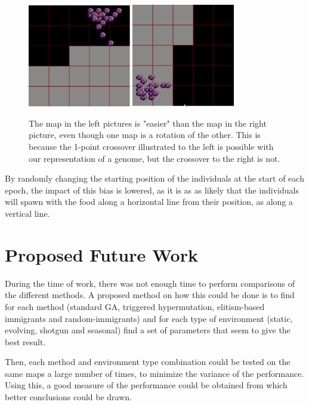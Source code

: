 \documentclass[a4paper,12pt]{article}
\begin{document}
\begin{figure}[h!]
\includegraphics[width=0.4\textwidth]{TopRight.png}
\includegraphics[width=0.4\textwidth]{BottomLeft.png}
\caption{The map in the left pictures is "easier" than the map in the right picture, even though one map is a rotation of the other. This is because the 1-point crossover illustrated to the left is possible with our representation of a genome, but the crossover to the right is not.}
\end{figure}

By randomly changing the starting position of the individuals at the start of each epoch, the impact of this bias is lowered, as it is as as likely that the individuals will spawn with the food along a horizontal line from their position, as along a vertical line.

\section{Proposed Future Work}
During the time of work, there was not enough time to perform comparisons of the different methods. A proposed method on how this could be done is to find for each method (standard GA, triggered hypermutation, elitism-based immigrants and random-immigrants) and for each type of environment (static, evolving, shotgun and seasonal) find a set of parameters that seem to give the best result.

Then, each method and environment type combination could be tested on the same maps a large number of times, to minimize the variance of the performance. Using this, a good measure of the performance could be obtained from which better conclusions could be drawn.
\end{document}
